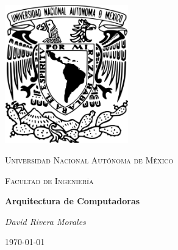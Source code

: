 \documentclass{article}
\begin{document}
\begin{titlepage}
    \centering
    \includegraphics[width=0.4\textwidth]{unam_logo.png}\par\vspace{1cm}
    {\scshape\Large Universidad Nacional Autónoma de México \par}
    \vspace{1cm}
    {\scshape\Large Facultad de Ingeniería \par}
    \vspace{1.5cm}
    {\huge\bfseries Arquitectura de Computadoras \par}
    \vspace{2cm}
    {\Large\itshape David Rivera Morales\par}
    \vfill
    {\large \today\par}
\end{titlepage}
\end{document}
